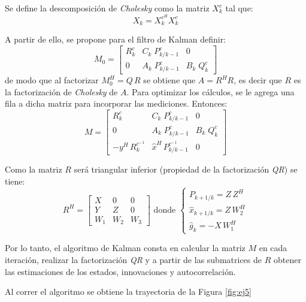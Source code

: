 	
	Se define la descomposición de \emph{Cholesky} como la matriz $X^{c}_k$ tal que:
	\begin{equation*}
		X_k = X^{c^{H}}_k X^{c}_k
	\end{equation*}	

	A partir de ello, se propone para el filtro de Kalman definir: 
	\begin{equation*}
		M_0 = \begin{bmatrix} R^{c}_k& C_k\; P^c_{k/k-1}& 0 \\[0.3em] 0& A_k\; P^c_{k/k-1}& B_k\; Q^c_k \end{bmatrix}
	\end{equation*}
	de modo que al factorizar $M^H_0 = Q\,R$ se obtiene que $A=R^H R$, es decir que $R$ es la factorización de \emph{Cholesky} de $A$. Para optimizar los cálculos, se le agrega una fila a dicha matriz para incorporar las mediciones. Entonces:
	\begin{equation*}
	M =  \begin{bmatrix} R^{c}_k& C_k\; P^c_{k/k-1}& 0 \\[0.3em] 0& A_k\; P^c_{k/k-1}& B_k\; Q^c_k \\[0.3em] -y^H\,R^{c^{-1}}_k & \hat{x}^H\, P^{c^{-1}}_{k/k-1} & 0 \end{bmatrix}
	\end{equation*}

	Como la matriz $R$ será triangular inferior (propiedad de la factorización \emph{QR}) se tiene:
	\begin{equation*}
	R^H = \begin{bmatrix} X&0&0\\[0.3em]Y&Z&0\\[0.3em]W_1&W_2&W_3\end{bmatrix} \text{ donde } \begin{cases} P_{k+1/k} = Z\,Z^H\\ \hat{x}_{k+1/k}=Z\,W^H_2\\ \hat{g}_k = -X\,W^H_1\end{cases}
	\end{equation*}

	Por lo tanto, el algoritmo de Kalman consta en calcular la matriz $M$ en cada iteración, realizar la factorización \emph{QR} y a partir de las submatrices de $R$ obtener las estimaciones de los estados, innovaciones y autocorrelación.

	Al correr el algoritmo se obtiene la trayectoria de la Figura \ref{fig:ej5} 
